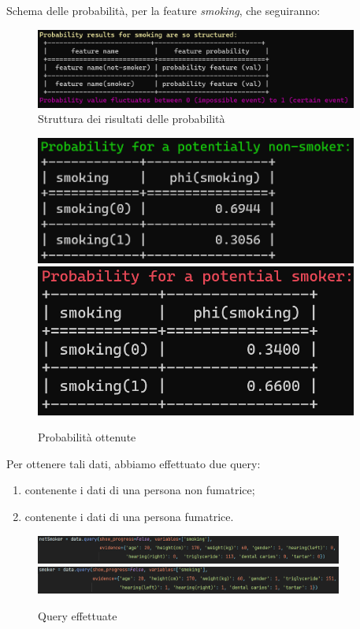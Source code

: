 \documentclass{article}
\begin{document}
\noindent
Schema delle probabilità, per la feature \textit{smoking}, che seguiranno:
\begin{figure}[H]
        \includegraphics[width=10.6cm]{schema2}
        \centering
        \caption{Struttura dei risultati delle probabilità}
        \centering
\end{figure}


\begin{figure}[H]
        \includegraphics[width=10.6cm]{probNotSmoke}
        \includegraphics[width=10.6cm]{probSmoke}
        \centering
        \caption{Probabilità ottenute}
        \centering
\end{figure}

Per ottenere tali dati, abbiamo effettuato due query:
\begin{enumerate}
    \item contenente i dati di una persona non fumatrice;
    \item contenente i dati di una persona fumatrice.
\end{enumerate}
\begin{figure}[H]
        \includegraphics[width=0.9\textwidth]{queryNotSmoke}
        \includegraphics[width=0.9\textwidth]{querySmoke}
        \centering
        \caption{Query effettuate}
        \centering
\end{figure}
%
\end{document}
